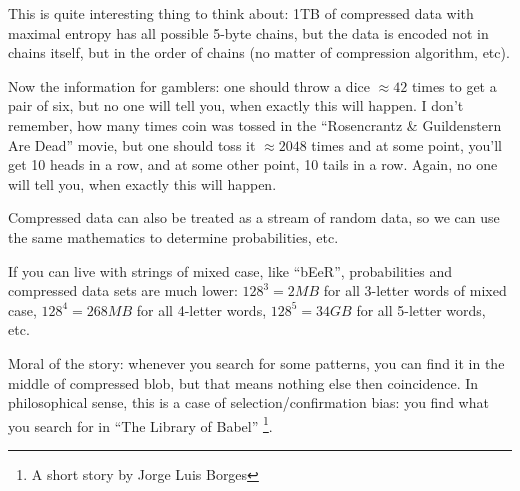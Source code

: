 This is quite interesting thing to think about: 1TB of compressed data with maximal entropy has all possible 5-byte chains,
but the data is encoded not in chains itself, but in the order of chains (no matter of compression algorithm, etc).

Now the information for gamblers: one should throw a dice $\approx 42$ times to get a pair of six, but no one will tell you, when exactly this will happen.
I don't remember, how many times coin was tossed in the ``Rosencrantz \& Guildenstern Are Dead'' movie, but one should toss it $\approx 2048$ times and at some point, you'll get 10 heads in a row,
and at some other point, 10 tails in a row. Again, no one will tell you, when exactly this will happen.

Compressed data can also be treated as a stream of random data, so we can use the same mathematics to determine probabilities, etc.

If you can live with strings of mixed case, like ``bEeR'', probabilities and compressed data sets are much lower:
$128^3=2MB$ for all 3-letter words of mixed case,
$128^4=268MB$ for all 4-letter words,
$128^5=34GB$ for all 5-letter words, etc.

Moral of the story: whenever you search for some patterns, you can find it in the middle of compressed blob, but that means nothing else then coincidence.
In philosophical sense, this is a case of selection/confirmation bias: you find what you search for in ``The Library of Babel''
\footnote{A short story by Jorge Luis Borges}.

